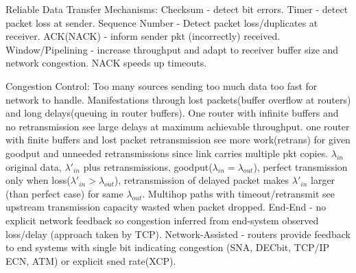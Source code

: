 \documentclass[8pt]{extarticle}
\begin{document}
\begin{multicols}{2}
Reliable Data Transfer Mechanisms: Checksum - detect bit errors. Timer - detect packet loss at sender. Sequence Number - Detect packet loss/duplicates at receiver. ACK(NACK) - inform sender pkt (incorrectly) received. Window/Pipelining - increase throughput and adapt to receiver buffer size and network congestion. NACK speeds up timeouts.

Congestion Control: Too many sources sending too much data too fast for network to handle. Manifestations through lost packets(buffer overflow at routers) and long delays(queuing in router buffers). One router with infinite buffers and no retransmission see large delays at maximum achievable throughput. one router with finite buffers and lost packet retransmission see more work(retrans) for given goodput and unneeded retransmissions since link carries multiple pkt copies. $\lambda_{in}$ original data, $\lambda'_{in}$ plus retransmissions, goodput($\lambda_{in}=\lambda_{out}$), perfect transmission only when loss($\lambda'_{in}>\lambda_{out}$), retransmission of delayed packet makes $\lambda'_{in}$ larger (than perfect case) for same $\lambda_{out}$. Multihop paths with timeout/retransmit see upstream transmission capacity wasted when packet dropped. End-End - no explicit network feedback so congestion inferred from end-system observed loss/delay (approach taken by TCP). Network-Assisted - routers provide feedback to end systems with single bit indicating congestion (SNA, DECbit, TCP/IP ECN, ATM) or explicit sned rate(XCP).


\end{multicols}
\end{document}
